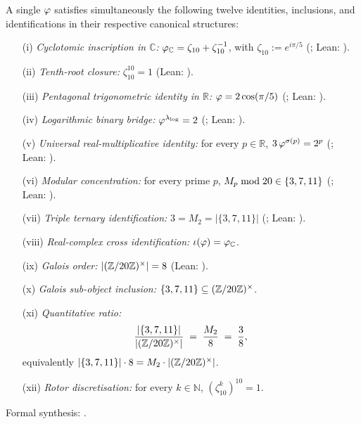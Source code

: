 \begin{Theorem}\label{thm:euler-connector}
A single $\varphi$ satisfies simultaneously the following twelve
identities, inclusions, and identifications in their respective
canonical structures:
\begin{enumerate}[topsep=0pt,itemsep=0.1em,leftmargin=2.3em]
  \item[\textup{(i)}] \emph{Cyclotomic inscription in $\mathbb{C}$:}
    $\varphi_\mathbb{C} = \zeta_{10}+\zeta_{10}^{-1}$, with
    $\zeta_{10}:=e^{i\pi/5}$ (; Lean:
    ).
  \item[\textup{(ii)}] \emph{Tenth-root closure:} $\zeta_{10}^{10}=1$
    (Lean: ).
  \item[\textup{(iii)}] \emph{Pentagonal trigonometric identity in
    $\mathbb{R}$:} $\varphi = 2\cos(\pi/5)$ (; Lean:
    ).
  \item[\textup{(iv)}] \emph{Logarithmic binary bridge:}
    $\varphi^{\lambda_{\log}} = 2$ (; Lean:
    ).
  \item[\textup{(v)}] \emph{Universal real-multiplicative identity:}
    for every $p\in\mathbb{R}$, $3\,\varphi^{\sigma(p)} = 2^{p}$
    (; Lean: ).
  \item[\textup{(vi)}] \emph{Modular concentration:} for every prime
    $p$, $M_{p}\bmod 20\in\{3,7,11\}$ (;
    Lean: ).
  \item[\textup{(vii)}] \emph{Triple ternary identification:}
    $3 = M_{2} = |\{3,7,11\}|$ (; Lean:
    ).
  \item[\textup{(viii)}] \emph{Real-complex cross identification:}
    $\iota(\varphi)=\varphi_\mathbb{C}$.
  \item[\textup{(ix)}] \emph{Galois order:}
    $|(\mathbb{Z}/20\mathbb{Z})^{\times}|=8$ (Lean: ).
  \item[\textup{(x)}] \emph{Galois sub-object inclusion:}
    $\{3,7,11\}\subseteq(\mathbb{Z}/20\mathbb{Z})^{\times}$.
  \item[\textup{(xi)}] \emph{Quantitative ratio:}
    \[
      \frac{|\{3,7,11\}|}{|(\mathbb{Z}/20\mathbb{Z})^{\times}|}
      \;=\; \frac{M_{2}}{8} \;=\; \frac{3}{8},
    \]
    equivalently $|\{3,7,11\}|\cdot 8 = M_{2}\cdot|(\mathbb{Z}/20\mathbb{Z})^{\times}|$.
  \item[\textup{(xii)}] \emph{Rotor discretisation:} for every
    $k\in\mathbb{N}$, $(\zeta_{10}^{k})^{10}=1$.
\end{enumerate}
Formal synthesis: .
\end{Theorem}

